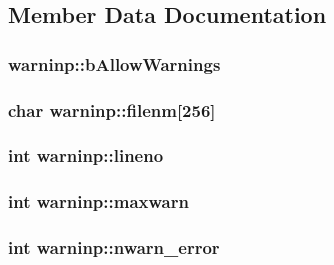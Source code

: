 \subsection{\-Member \-Data \-Documentation}
\hypertarget{structwarninp_a21a7f5d9001c3641245afdc43831b628}{
\subsubsection[{b\-Allow\-Warnings}]{ {\bf warninp\-::b\-Allow\-Warnings}}}\label{structwarninp_a21a7f5d9001c3641245afdc43831b628}
\hypertarget{structwarninp_a0c90f686085a696797a05b254d3e837a}{
\subsubsection[{filenm}]{\setlength{\rightskip}{0pt plus 5cm}char {\bf warninp\-::filenm}\mbox{[}256\mbox{]}}}\label{structwarninp_a0c90f686085a696797a05b254d3e837a}
\hypertarget{structwarninp_a5119c741ab1e79f44110cfce1a90e093}{
\subsubsection[{lineno}]{\setlength{\rightskip}{0pt plus 5cm}int {\bf warninp\-::lineno}}}\label{structwarninp_a5119c741ab1e79f44110cfce1a90e093}
\hypertarget{structwarninp_ae6d6db63024ed78edd77ad0f528a58ef}{
\subsubsection[{maxwarn}]{\setlength{\rightskip}{0pt plus 5cm}int {\bf warninp\-::maxwarn}}}\label{structwarninp_ae6d6db63024ed78edd77ad0f528a58ef}
\hypertarget{structwarninp_aa4ce11f0389a5a68667a456876032f52}{
\subsubsection[{nwarn\-\_\-error}]{\setlength{\rightskip}{0pt plus 5cm}int {\bf warninp\-::nwarn\-\_\-error}}}\label{structwarninp_aa4ce11f0389a5a68667a456876032f52}
